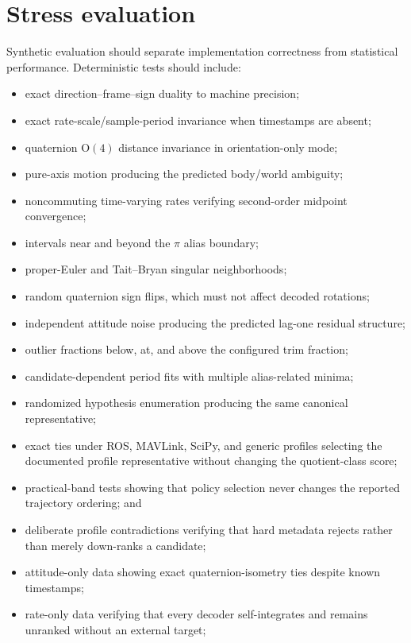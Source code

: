 \documentclass[11pt]{article}
\newcommand{\OO}{\mathrm{O}}
\begin{document}
    \section{Stress evaluation}\label{app:stress}

    Synthetic evaluation should separate implementation correctness from statistical
    performance. Deterministic tests should include:
    \begin{itemize}[nosep]
    \item exact direction--frame--sign duality to machine precision;
    \item exact rate-scale/sample-period invariance when timestamps are absent;
    \item quaternion $\OO(4)$ distance invariance in orientation-only mode;
    \item pure-axis motion producing the predicted body/world ambiguity;
    \item noncommuting time-varying rates verifying second-order midpoint convergence;
    \item intervals near and beyond the $\pi$ alias boundary;
    \item proper-Euler and Tait--Bryan singular neighborhoods;
    \item random quaternion sign flips, which must not affect decoded rotations;
    \item independent attitude noise producing the predicted lag-one residual structure;
    \item outlier fractions below, at, and above the configured trim fraction;
    \item candidate-dependent period fits with multiple alias-related minima;
    \item randomized hypothesis enumeration producing the same canonical representative;
    \item exact ties under ROS, MAVLink, SciPy, and generic profiles selecting the documented
    profile representative without changing the quotient-class score;
    \item practical-band tests showing that policy selection never changes the reported
    trajectory ordering; and
    \item deliberate profile contradictions verifying that hard metadata rejects rather
    than merely down-ranks a candidate;
    \item attitude-only data showing exact quaternion-isometry ties despite known timestamps;
    \item rate-only data verifying that every decoder self-integrates and remains unranked without an external target;

\end{itemize}
\end{document}
